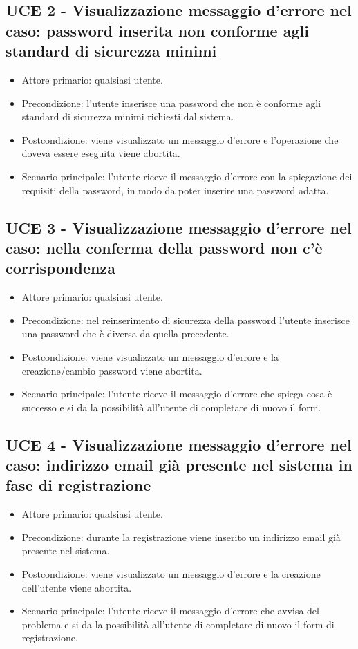 \subsection{UCE 2 - Visualizzazione messaggio d'errore nel caso: password inserita non conforme agli standard di sicurezza minimi}
    \begin{itemize}
        \item Attore primario: qualsiasi utente.
        \item Precondizione: l'utente inserisce una password che non è conforme agli standard di sicurezza minimi richiesti dal sistema.
        \item Postcondizione: viene visualizzato un messaggio d'errore e l'operazione che doveva essere eseguita viene abortita.
        \item Scenario principale: l'utente riceve il messaggio d'errore con la spiegazione dei requisiti della password, in modo da poter inserire una password adatta.
    \end{itemize}
\subsection{UCE 3 - Visualizzazione messaggio d'errore nel caso: nella conferma della password non c'è corrispondenza}
    \begin{itemize}
        \item Attore primario: qualsiasi utente.
        \item Precondizione: nel reinserimento di sicurezza della password l'utente inserisce una password che è diversa da quella precedente.
        \item Postcondizione: viene visualizzato un messaggio d'errore e la creazione/cambio password viene abortita.
        \item Scenario principale: l'utente riceve il messaggio d'errore che spiega cosa è successo e si da la possibilità all'utente di completare di nuovo il form.
    \end{itemize}
\subsection{UCE 4 - Visualizzazione messaggio d'errore nel caso: indirizzo email già presente nel sistema in fase di registrazione}
    \begin{itemize}
        \item Attore primario: qualsiasi utente.
        \item Precondizione: durante la registrazione viene inserito un indirizzo email già presente nel sistema.
        \item Postcondizione: viene visualizzato un messaggio d'errore e la creazione dell'utente viene abortita.
        \item Scenario principale: l'utente riceve il messaggio d'errore che avvisa del problema e si da la possibilità all'utente di completare di nuovo il form di registrazione.
    \end{itemize}
